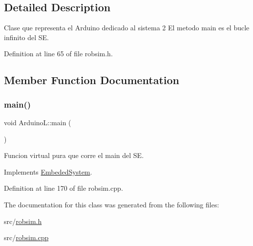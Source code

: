 \subsection{Detailed Description}
Clase que representa el Arduino dedicado al sistema 2 El metodo main es el bucle infinito del SE. 

Definition at line 65 of file robsim.\+h.



\subsection{Member Function Documentation}
\mbox{\label{classArduinoL_a27a3e0f5bfbf48f558bce2d31a72d502}} 
\subsubsection{\texorpdfstring{main()}{main()}}
{\footnotesize\ttfamily void Arduino\+L\+::main (\begin{DoxyParamCaption}{ }\end{DoxyParamCaption})\hspace{0.3cm}{\ttfamily [virtual]}}



Funcion virtual pura que corre el main del SE. 



Implements \hyperlink{classEmbededSystem_a3a333d4954af4068f5e97301b4f55c48}{Embeded\+System}.



Definition at line 170 of file robsim.\+cpp.



The documentation for this class was generated from the following files\+:\begin{DoxyCompactItemize}
\item 
src/\hyperlink{robsim_8h}{robsim.\+h}\item 
src/\hyperlink{robsim_8cpp}{robsim.\+cpp}\end{DoxyCompactItemize}
